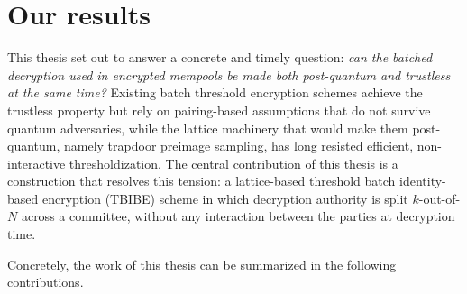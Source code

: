 \section{Our results}
\label{section:1.2}
This thesis set out to answer a concrete and timely question: \emph{can the
batched decryption used in encrypted mempools be made both post-quantum and
trustless at the same time?} Existing batch threshold encryption schemes achieve
the trustless property but rely on pairing-based assumptions that do not survive
quantum adversaries, while the lattice machinery that would make them
post-quantum, namely trapdoor preimage sampling, has long resisted efficient,
non-interactive thresholdization. The central contribution of this thesis is a
construction that resolves this tension: a lattice-based threshold batch
identity-based encryption (\textsf{TBIBE}) scheme in which decryption authority
is split $k$-out-of-$N$ across a committee, without any interaction between the
parties at decryption time.
 
Concretely, the work of this thesis can be summarized in the following
contributions.
 
